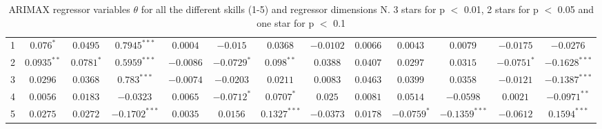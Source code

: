 \begin{landscape}
\begin{table}[]
\begin{tabular}{|c|c c c c c c c c c c c c|}
         1 & $0.076^{*}$ & $0.0495^{}$ & $0.7945^{***}$ & $0.0004^{}$ & $-0.015^{}$ & $0.0368^{}$ & $-0.0102^{}$ & $0.0066^{}$ & $0.0043^{}$ & $0.0079^{}$ & $-0.0175^{}$ & $-0.0276^{}$\\
         2 & $0.0935^{**}$ & $0.0781^{*}$ & $0.5959^{***}$ & $-0.0086^{}$ & $-0.0729^{*}$ & $0.098^{**}$ & $0.0388^{}$ & $0.0407^{}$ & $0.0297^{}$ & $0.0315^{}$ & $-0.0751^{*}$ & $-0.1628^{***}$\\
         3 & $0.0296^{}$ & $0.0368^{}$ & $0.783^{***}$ & $-0.0074^{}$ & $-0.0203^{}$ & $0.0211^{}$ & $0.0083^{}$ & $0.0463^{}$ & $0.0399^{}$ & $0.0358^{}$ & $-0.0121^{}$ & $-0.1387^{***}$\\
         4 & $0.0056^{}$ & $0.0183^{}$ & $-0.0323^{}$ & $0.0065^{}$ & $-0.0712^{*}$ & $0.0707^{*}$ & $0.025^{}$ & $0.0081^{}$ & $0.0514^{}$ & $-0.0598^{}$ & $0.0021^{}$ & $-0.0971^{**}$\\
         5 & $0.0275^{}$ & $0.0272^{}$ & $-0.1702^{***}$ & $0.0035^{}$ & $0.0156^{}$ & $0.1327^{***}$ & $-0.0373^{}$ & $0.0178^{}$ & $-0.0759^{*}$ & $-0.1359^{***}$ & $-0.0612^{}$ & $0.1594^{***}$\\
        \hline
    \end{tabular}
    \caption{ARIMAX regressor variables $\theta$ for all the different skills (1-5) and regressor dimensions N. 3 stars for p $<$ 0.01, 2 stars for p $<$ 0.05 and one star for p $<$ 0.1}
    \label{tab:varimax_regressor_variables}
\end{table}


\end{landscape}
